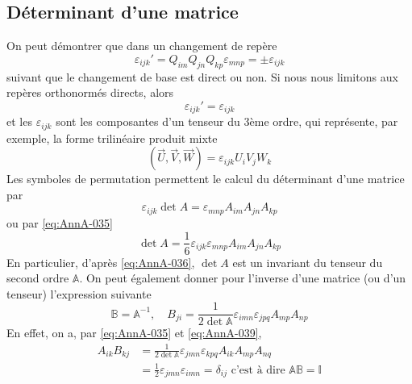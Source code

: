 \subsection{Déterminant d'une matrice}
On peut démontrer que dans un changement de repère
\begin{equation}
    \varepsilon_{ijk}' = Q_{im} Q_{jn} Q_{kp} \varepsilon_{mnp} = \pm \varepsilon_{ijk}
    \label{eq:AnnA-036}
\end{equation}
suivant que le changement de base est direct ou non.
Si nous nous limitons aux repères orthonormés directs, alors
\begin{equation}
    \varepsilon_{ijk}' = \varepsilon_{ijk}
    \label{eq:AnnA-037}
\end{equation}
et les $\varepsilon_{ijk}$ sont les composantes d'un tenseur du 3ème ordre, qui représente, par exemple, la forme trilinéaire produit mixte
\begin{equation}
    \left( \vec{U}, \vec{V}, \vec{W} \right) = \varepsilon_{ijk} U_i V_j W_k
    \label{eq:AnnA-038}
\end{equation}
Les symboles de permutation permettent le calcul du déterminant d'une matrice par
\begin{equation}
    \varepsilon_{ijk} \det A = \varepsilon_{mnp} A_{im} A_{jn} A_{kp}
    \label{eq:AnnA-039}
\end{equation}
ou par \eqref{eq:AnnA-035}
\begin{equation}
    \det A = \frac{1}{6} \varepsilon_{ijk} \varepsilon_{mnp} A_{im} A_{jn} A_{kp}
    \label{eq:AnnA-040}
\end{equation}
En particulier, d'après \eqref{eq:AnnA-036}, $\det A$ est un invariant du tenseur du second ordre $\mathbb{A}$.
On peut également donner pour l'inverse d'une matrice (ou d'un tenseur) l'expression suivante
\begin{equation}
    \mathbb{B} = \mathbb{A}^{-1}, \quad B_{ji} = \frac{1}{2 \det \mathbb{A}} \varepsilon_{imn} \varepsilon_{jpq} A_{mp} A_{np}
    \label{eq:AnnA-041}
\end{equation}
En effet, on a, par \eqref{eq:AnnA-035} et \eqref{eq:AnnA-039},
\begin{align*}
    A_{ik} B_{kj} &= \frac{1}{2 \det \mathbb{A}} \varepsilon_{jmn} \varepsilon_{kpq} A_{ik} A_{mp} A_{nq} \\
    &= \frac{1}{2} \varepsilon_{jmn} \varepsilon_{imn} = \delta_{ij} \text{ c'est à dire } \mathbb{A} \mathbb{B} = \mathbb{I}
\end{align*}
